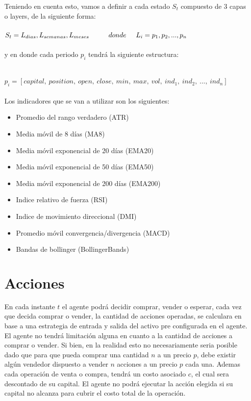\clearpage

Teniendo en cuenta esto, vamos a definir a cada estado $S_t$  compuesto de 3 capas o layers, de la siguiente forma:
\\\\

$ S_t = L_{dias}, L_{semanas}, L_{meses} \hspace*{1cm} donde \hspace*{0.5cm} L_i = p_1, p_2, ..., p_n $
\\\\
y en donde cada periodo $p_i$ tendrá la siguiente estructura:
\\\\
{\small $p_i = [capital,\ position,\ open,\ close,\ min,\ max,\ vol,\ ind_1,\ ind_2,\ ...,\ ind_n]$ \\\\


Los indicadores que se van a utilizar son los siguientes:

\begin{itemize}
 \item Promedio del rango verdadero (ATR)
 \item Media móvil de 8 días (MA8)
 \item Media móvil exponencial de 20 días (EMA20)
 \item Media móvil exponencial de 50 días (EMA50)
 \item Media móvil exponencial de 200 días (EMA200)
 \item Indice relativo de fuerza (RSI) 
 \item Indice de movimiento direccional (DMI)
 \item Promedio móvil convergencia/divergencia (MACD)
 \item Bandas de bollinger (BollingerBands)
\end{itemize}
}

\section{Acciones}

En cada instante $t$ el agente podrá decidir comprar, vender o esperar, cada vez que decida comprar o vender, la cantidad de acciones operadas, se calculara en base a una estrategia de entrada y salida del activo pre configurada en el agente.
El agente no tendrá limitación alguna en cuanto a la cantidad de acciones a comprar o vender. Si bien, en la realidad esto no necesariamente seria posible dado que para que pueda comprar una cantidad $n$ a un precio $p$, debe existir algún vendedor dispuesto a vender $n$ acciones a un precio $p$ cada una.
Ademas cada operación de venta o compra, tendrá un costo asociado $c$, el cual sera descontado de su capital. El agente no podrá ejecutar la acción elegida si su capital no alcanza para cubrir el costo total de la operación.



